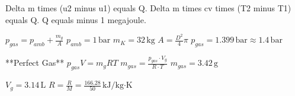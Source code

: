 Delta m times (u2 minus u1) equals Q.  
Delta m times cv times (T2 minus T1) equals Q.  
Q equals minus 1 megajoule.

\( p_{gas} = p_{amb} + \frac{m_g}{A} \)  
\( p_{amb} = 1 \, \text{bar} \)  
\( m_K = 32 \, \text{kg} \)  
\( A = \frac{D^2}{4} \pi \)  
\( p_{gas} = 1.399 \, \text{bar} \approx 1.4 \, \text{bar} \)  

**Perfect Gas**  
\( p_{gas} V = m_g R T \)  
\( m_{gas} = \frac{p_{gas} \cdot V_g}{R \cdot T} \)  
\( m_{gas} = 3.42 \, \text{g} \)  

\( V_g = 3.14 \, \text{L} \)  
\( R = \frac{R}{M} = \frac{166.28}{50} \, \text{kJ/kg·K} \)